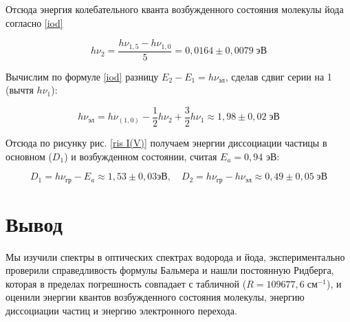 \documentclass[12pt]{kiarticle} %
\begin{document}
	Отсюда энергия колебательного кванта возбужденного состояния молекулы йода согласно \eqref{iod}
	
	\begin{equation}\label{}
	h\nu_2 = \dfrac{h\nu_{1, 5} - h\nu_{1, 0}}{5} = 0,0164 \pm 0,0079 \; эВ
	\end{equation}
	
	Вычислим по формуле \eqref{iod} разницу $ E_2 - E_1 = h\nu_{эл}$, сделав сдвиг серии на 1 (вычтя $ h\nu_1 $):
	
	\begin{equation}\label{}
	h \nu_{эл} = h \nu_(1,0) - \dfrac{1}{2} h\nu_2 + \dfrac{3}{2}h\nu_1 \approx 1,98  \pm 0,02 \; эВ
	\end{equation}
	
	Отсюда по рисунку рис. \ref{ris I(V)} получаем энергии диссоциации частицы в основном ($ D_1 $) и возбужденном состоянии, считая $ E_a = 0,94 $ эВ:
	
	\begin{equation}\label{}
	D_1 = h \nu_{гр} - E_a \approx 1,53 \pm 0,03 эВ, \quad D_2 = h \nu_{гр} - h \nu_{эл} \approx 0,49 \pm 0,05 \; эВ
	\end{equation}
	
	\section{Вывод }
	
	Мы изучили спектры в оптических спектрах водорода и йода, экспериментально проверили справедливость формулы Бальмера и нашли постоянную Ридберга, которая в пределах погрешность совпадает с табличной ($ R = 109 677,6 \; см^{-1} $), и оценили энергии квантов возбужденного состояния молекулы, энергию диссоциации частиц и энергию электронного перехода.
	
\end{document}
